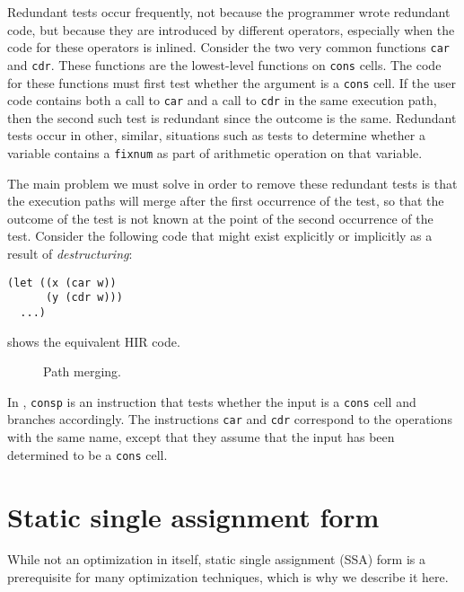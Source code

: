 Redundant tests occur frequently, not because the programmer wrote
redundant code, but because they are introduced by different
\commonlisp{} operators, especially when the code for these operators
is inlined.  Consider the two very common \commonlisp{} functions
\texttt{car} and \texttt{cdr}.  These functions are the lowest-level
functions on \texttt{cons} cells.  The code for these functions must
first test whether the argument is a \texttt{cons} cell.  If the user
code contains both a call to \texttt{car} and a call to \texttt{cdr}
in the same execution path, then the second such test is redundant
since the outcome is the same.  Redundant tests occur in other,
similar, situations such as tests to determine whether a variable
contains a \texttt{fixnum} as part of arithmetic operation on that
variable.

The main problem we must solve in order to remove these redundant
tests is that the execution paths will merge after the first
occurrence of the test, so that the outcome of the test is not known
at the point of the second occurrence of the test.  Consider the
following code that might exist explicitly or implicitly as a result
of \emph{destructuring}:

\begin{verbatim}
(let ((x (car w))
      (y (cdr w)))
  ...)
\end{verbatim}

 shows the equivalent HIR code.

\begin{figure}
\begin{center}
\end{center}
\caption{\label{fig-path-merging}
Path merging.}
\end{figure}

In , \texttt{consp} is an instruction that
tests whether the input is a \texttt{cons} cell and branches
accordingly.  The instructions \texttt{car} and \texttt{cdr}
correspond to the \commonlisp{} operations with the same name, except
that they assume that the input has been determined to be a
\texttt{cons} cell.

\section{Static single assignment form}
\label{mir-optimizations-ssa-form}

While not an optimization in itself, static single assignment (SSA)
form is a prerequisite for many optimization techniques, which is why
we describe it here. 

